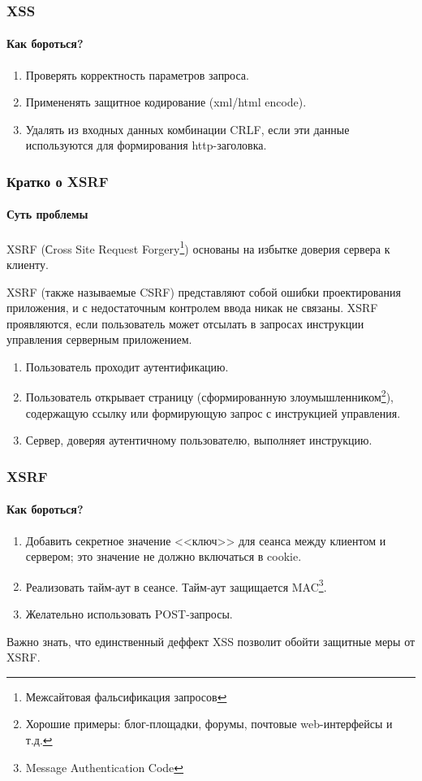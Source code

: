 \begin{frame}
    \frametitle{XSS}
    \framesubtitle{Как бороться?}
    
    \begin{enumerate}
        \item Проверять корректность параметров запроса.
        \item Примененять защитное кодирование (xml/html encode).
        \item Удалять из входных данных комбинации CRLF, если эти данные используются для формирования http-заголовка.
    \end{enumerate}
\end{frame}


\begin{frame}
    \frametitle{Кратко о XSRF}
    \framesubtitle{Суть проблемы}

    XSRF (Сross Site Request Forgery\footnote{Межсайтовая фальсификация запросов}) основаны на избытке доверия сервера к клиенту.

    XSRF (также называемые CSRF) представляют собой ошибки проектирования приложения, и с недостаточным контролем ввода никак не связаны. XSRF проявляются, если пользователь может отсылать в запросах инструкции управления серверным приложением.
    \begin{enumerate}
        \item Пользователь проходит аутентификацию.
        \item Пользователь открывает страницу (сформированную злоумышленником\footnote{Хорошие примеры: блог-площадки, форумы, почтовые web-интерфейсы и т.д.}), содержащую ссылку или формирующую запрос с инструкцией управления.
        \item Сервер, доверяя аутентичному пользователю, выполняет инструкцию.
    \end{enumerate}
\end{frame}

\begin{frame}
    \frametitle{XSRF}
    \framesubtitle{Как бороться?}

    \begin{enumerate}
        \item Добавить секретное значение <<ключ>> для сеанса между клиентом и сервером; это значение не должно включаться в cookie.
        \item Реализовать тайм-аут в сеансе. Тайм-аут защищается MAC\footnote{Message Authentication Code}.
        \item Желательно использовать POST-запросы.
    \end{enumerate}
    
    Важно знать, что единственный деффект XSS позволит обойти защитные меры от XSRF.
\end{frame}



